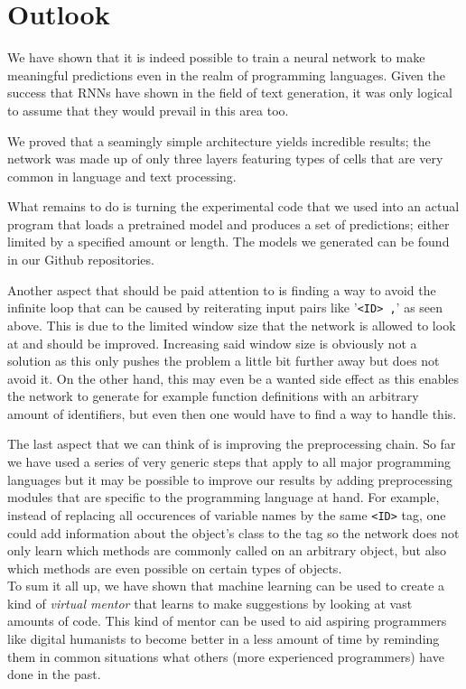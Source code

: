\section{Outlook}
\label{sec:outlook}

    We have shown that it is indeed possible to train a neural network to make meaningful predictions
    even in the realm of programming languages. Given the success that RNNs have shown in the field
    of text generation, it was only logical to assume that they would prevail in this area too.

    We proved that a seamingly simple architecture yields incredible results; the network was made up
    of only three layers featuring types of cells that are very common in language and text processing.

    What remains to do is turning the experimental code that we used into an actual program that
    loads a pretrained model and produces a set of predictions; either limited by a specified
    amount or length. The models we generated can be found in our Github repositories.

    Another aspect that should be paid attention to is finding a way to avoid the infinite loop
    that can be caused by reiterating input pairs like '\verb|<ID> ,|' as seen above. This is
    due to the limited window size that the network is allowed to look at and should be improved.
    Increasing said window size is obviously not a solution as this only pushes the problem a little
    bit further away but does not avoid it. On the other hand, this may even be a wanted side effect
    as this enables the network to generate for example function definitions with an arbitrary amount
    of identifiers, but even then one would have to find a way to handle this.

    The last aspect that we can think of is improving the preprocessing chain. So far we have used
    a series of very generic steps that apply to all major programming languages but it may be
    possible to improve our results by adding preprocessing modules that are specific to the
    programming language at hand. For example, instead of replacing all occurences of variable names
    by the same \verb+<ID>+ tag, one could add information about the object's class to the tag so
    the network does not only learn which methods are commonly called on an arbitrary object, but also
    which methods are even possible on certain types of objects. \\

    To sum it all up, we have shown that machine learning can be used to create a kind of
    \textit{virtual mentor} that learns to make suggestions by looking at vast amounts of code.
    This kind of mentor can be used to aid aspiring programmers like digital humanists to become
    better in a less amount of time by reminding them in common situations what others (more experienced programmers)
    have done in the past.
